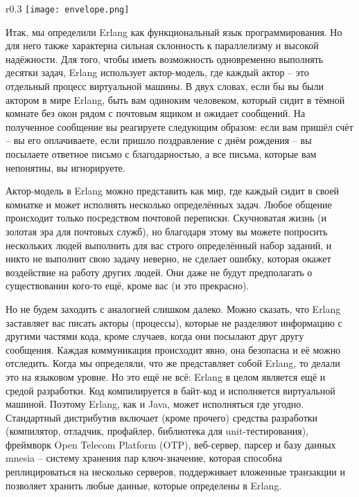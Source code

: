 \begin{wrapfigure}{r}{0.3\linewidth}
    \texttt{[image: envelope.png]}
\end{wrapfigure}
Итак, мы определили Erlang как функциональный язык программирования.
Но для него также характерна сильная склонность к параллелизму и высокой надёжности.
Для того, чтобы иметь возможность одновременно выполнять десятки задач, Erlang использует актор\--модель, где каждый актор \--- это отдельный процесс виртуальной машины.
В двух словах, если бы вы были актором в мире Erlang, быть вам одиноким человеком, который сидит в тёмной комнате без окон рядом с почтовым ящиком и ожидает сообщений.
На полученное сообщение вы реагируете следующим образом: если вам пришёл счёт \--- вы его оплачиваете, если пришло поздравление с днём рождения \--- вы посылаете ответное письмо с благодарностью, а все письма, которые вам непонятны, вы игнорируете.

Актор\--модель в Erlang можно представить как мир, где каждый сидит в своей комнатке и может исполнять несколько определённых задач.
Любое общение происходит только посредством почтовой переписки.
Скучноватая жизнь (и золотая эра для почтовых служб), но благодаря этому вы можете попросить нескольких людей выполнить для вас строго определённый набор заданий, и никто не выполнит свою задачу неверно, не сделает ошибку, которая окажет воздействие на работу других людей.
Они даже не будут предполагать о существовании кого\--то ещё, кроме вас (и это прекрасно).

Но не будем заходить с аналогией слишком далеко.
Можно сказать, что Erlang заставляет вас писать акторы (процессы), которые не разделяют информацию с другими частями кода, кроме случаев, когда они посылают друг другу сообщения.
Каждая коммуникация происходит явно, она безопасна и её можно отследить.
Когда мы определяли, что же представляет собой Erlang, то делали это на языковом уровне.
Но это ещё не всё: Erlang в целом является ещё и средой разработки.
Код компилируется в байт\--код и исполняется виртуальной машиной.
Поэтому Erlang, как и Java, может исполняться где угодно.
Стандартный дистрибутив включает (кроме прочего) средства разработки (компилятор, отладчик, профайлер, библиотека для unit\--тестирования), фреймворк Open Telecom Platform (OTP), веб\--сервер, парсер и базу данных mnesia \--- систему хранения пар ключ\--значение, которая способна реплицироваться на несколько серверов, поддерживает вложенные транзакции и позволяет хранить любые данные, которые определены в Erlang.

